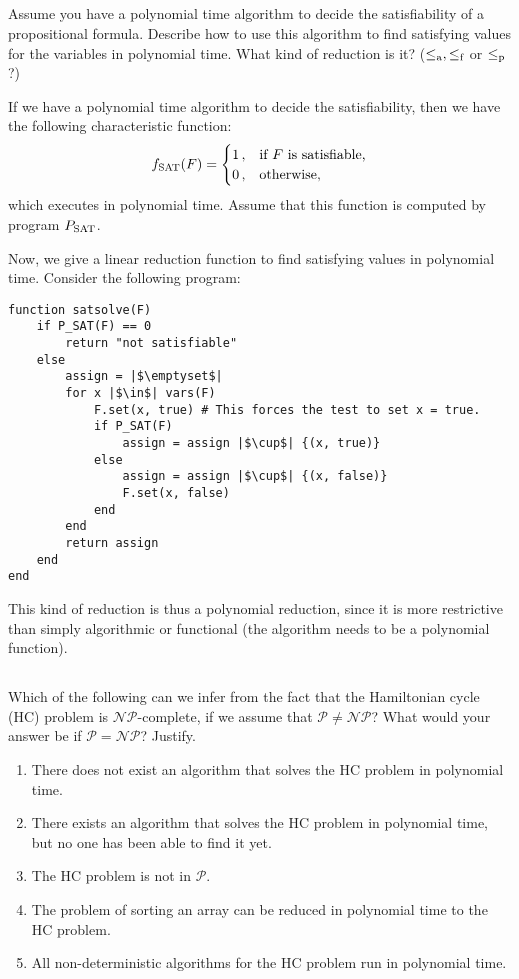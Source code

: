 \subsection{} %
Assume you have a polynomial time algorithm to decide
the satisfiability of a propositional formula.
Describe how to use this algorithm to find satisfying values for the variables
in polynomial time.
What kind of reduction is it?
(\(\le_\textnormal{a}, \le_\textnormal{f}\) or \(\le_\textnormal{p}\)?)

\begin{solution}
	If we have a polynomial time algorithm to decide the satisfiability,
	then we have the following characteristic function:
	\[
	f_{\textnormal{SAT}}(F) = \begin{cases} 1\,, & \textnormal{if } F \textnormal{ is satisfiable,}\\
	0\,, & \textnormal{otherwise,}
	\end{cases}
	\]
	which executes in polynomial time.
	Assume that this function is computed by program \(P_\textnormal{SAT}\).

	Now, we give a linear reduction function to find satisfying values
	in polynomial time.
	Consider the following program:
\begin{verbatim}
function satsolve(F)
	if P_SAT(F) == 0
		return "not satisfiable"
	else
		assign = |$\emptyset$|
		for x |$\in$| vars(F)
			F.set(x, true) # This forces the test to set x = true.
			if P_SAT(F)
				assign = assign |$\cup$| {(x, true)}
			else
				assign = assign |$\cup$| {(x, false)}
				F.set(x, false)
			end
		end
		return assign
	end
end
\end{verbatim}
	This kind of reduction is thus a polynomial reduction,
	since it is more restrictive than simply algorithmic or functional
	(the algorithm needs to be a polynomial function).
\end{solution}

\subsection{} %
Which of the following can we infer
from the fact that the Hamiltonian cycle (HC) problem
is \(\mathcal{NP}\)-complete,
if we assume that \(\mathcal{P} \ne \mathcal{NP}\)?
What would your answer be if \(\mathcal{P} = \mathcal{NP}\)?
Justify.
\begin{enumerate}
	\item There does not exist an algorithm
	that solves the HC problem in polynomial time.
	\item There exists an algorithm that solves the HC problem
	in polynomial time, but no one has been able to find it yet.
	\item The HC problem is not in \(\mathcal{P}\).
	\item The problem of sorting an array can be reduced
	in polynomial time to the HC problem.
	\item All non-deterministic algorithms for the HC problem
	run in polynomial time.
\end{enumerate}

